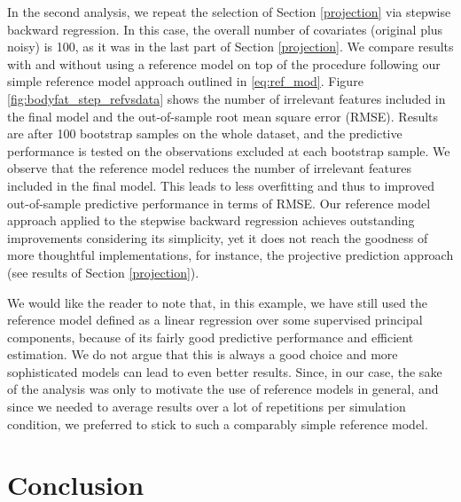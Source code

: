 \documentclass[american,]{article}
\theoremstyle{definition}
\begin{document}
In the second analysis, we repeat the selection of Section \ref{projection} via stepwise backward regression. In this case, the overall number of covariates (original plus noisy) is 100, as it was in the last part of Section \ref{projection}. We compare results with and without using a reference model on top of the procedure following our simple reference model approach outlined in \eqref{eq:ref_mod}. Figure \ref{fig:bodyfat_step_refvsdata} shows the number of irrelevant features included in the final model and the out-of-sample root mean square error (RMSE). Results are after 100 bootstrap samples on the whole dataset, and the predictive performance is tested on the observations excluded at each bootstrap sample. We observe that the reference model reduces the number of irrelevant features included in the final model. This leads to less overfitting and thus to improved out-of-sample predictive performance in terms of RMSE. Our reference model approach applied to the stepwise backward regression achieves outstanding improvements considering its simplicity, yet it does not reach the goodness of more thoughtful implementations, for instance, the projective prediction approach (see results of Section \ref{projection}). 


We would like the reader to note that, in this example, we have still used the reference model defined as a linear regression over some supervised principal components, because of its fairly good predictive performance and efficient estimation. We do not argue that this is always a good choice and more sophisticated models can lead to even better results. Since, in our case, the sake of the analysis was only to motivate the use of reference models in general, and since we needed to average results over a lot of repetitions per simulation condition, we preferred to stick to such a comparably simple reference model.




\hypertarget{conclusion}{%
\section{Conclusion}\label{conclusion}}
\end{document}
